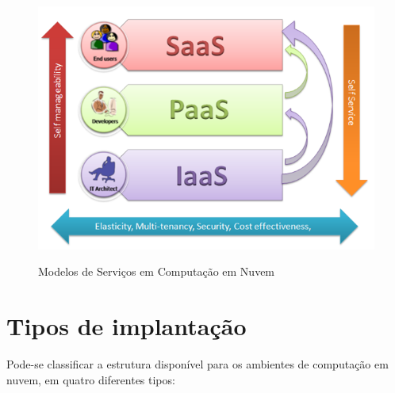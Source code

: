 \begin{figure}[H]
\centering
\includegraphics[scale=1]{imagens/delivery_models.png}
\caption{Modelos de Serviços em Computação em Nuvem}\cite{Alhamad2010}
\label{fig:modelo-servicos}
\end{figure}

\section{Tipos de implantação}
Pode-se classificar a estrutura disponível para os ambientes de computação em nuvem, em quatro diferentes tipos:

